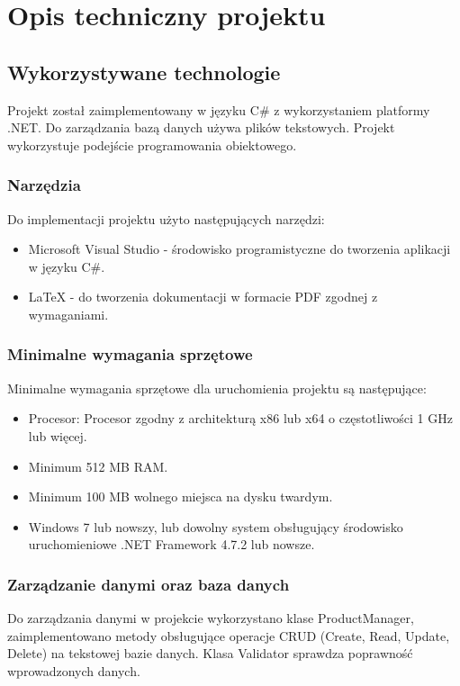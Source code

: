 ﻿%
\chapter{Opis techniczny projektu}
\section{Wykorzystywane technologie}

Projekt został zaimplementowany w języku C\# z wykorzystaniem platformy .NET. Do zarządzania bazą danych używa plików tekstowych. Projekt wykorzystuje podejście programowania obiektowego.

\subsection{Narzędzia}
Do implementacji projektu użyto następujących narzędzi:
\begin{itemize}
    \item Microsoft Visual Studio - środowisko programistyczne do tworzenia aplikacji w języku C\#.
    \item LaTeX - do tworzenia dokumentacji w formacie PDF zgodnej z wymaganiami.
\end{itemize}
\subsection{Minimalne wymagania sprzętowe}
Minimalne wymagania sprzętowe dla uruchomienia projektu są następujące:
\begin{itemize}
    \item Procesor: Procesor zgodny z architekturą x86 lub x64 o częstotliwości 1 GHz lub więcej.
    \item Minimum 512 MB RAM.
    \item Minimum 100 MB wolnego miejsca na dysku twardym.
    \item  Windows 7 lub nowszy, lub dowolny system obsługujący środowisko uruchomieniowe .NET Framework 4.7.2 lub nowsze.
\end{itemize}
\subsection{Zarządzanie danymi oraz baza danych}

Do zarządzania danymi w projekcie wykorzystano klase ProductManager, zaimplementowano metody obsługujące operacje CRUD (Create, Read, Update, Delete) na tekstowej bazie danych. Klasa Validator sprawdza poprawność wprowadzonych danych.


